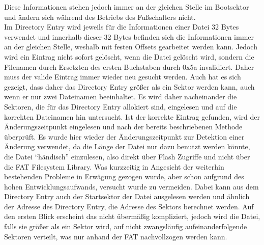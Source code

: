 Diese Informationen stehen jedoch immer an der gleichen Stelle im Bootsektor und ändern sich während des Betriebs des Fußschalters nicht. \\
Im Directory Entry wird jeweils für die Informationen einer Datei 32 Bytes verwendet und innerhalb dieser 32 Bytes befinden sich die Informationen immer an der gleichen Stelle, weshalb mit festen Offsets gearbeitet werden kann. Jedoch wird ein Eintrag nicht sofort gelöscht, wenn die Datei gelöscht wird, sondern die Filenamen durch Ersetzten des ersten Buchstaben durch 0x5a invalidiert. Daher muss der valide Eintrag immer wieder neu gesucht werden. Auch hat es sich gezeigt, dass daher das Directory Entry größer als ein Sektor werden kann, auch wenn er nur zwei Dateinamen beeinhaltet. Es wird daher nacheinander die Sektoren, die für das Directory Entry allokiert sind, eingelesen und auf die korrekten Dateinamen hin untersucht. Ist der korrekte Eintrag gefunden, wird der Änderungszeitpunkt eingelesen und nach der bereits beschriebenen Methode überprüft. Es wurde hier wieder der Änderungszeitpunkt zur Detektion einer Änderung verwendet, da die Länge der Datei nur dazu benutzt werden könnte, die Datei ``händisch'' einzulesen, also direkt über Flash Zugriffe und nicht über die \ac{FAT} Filesystem Library. Was kurzzeitig in Angesicht der weiterhin bestehenden Probleme in Erwägung gezogen wurde, aber schon aufgrund des hohen Entwicklungsaufwands, versucht wurde zu vermeiden. Dabei kann aus dem Directory Entry auch der Startsektor der Datei ausgelesen werden und ähnlich der Adresse des Directory Entry, die Adresse des Sektors berechnet werden. Auf den ersten Blick erscheint das nicht übermäßig kompliziert, jedoch wird die Datei, falls sie größer als ein Sektor wird, auf nicht zwangsläufig aufeinanderfolgende Sektoren verteilt, was nur anhand der \ac{FAT} nachvollzogen werden kann.

